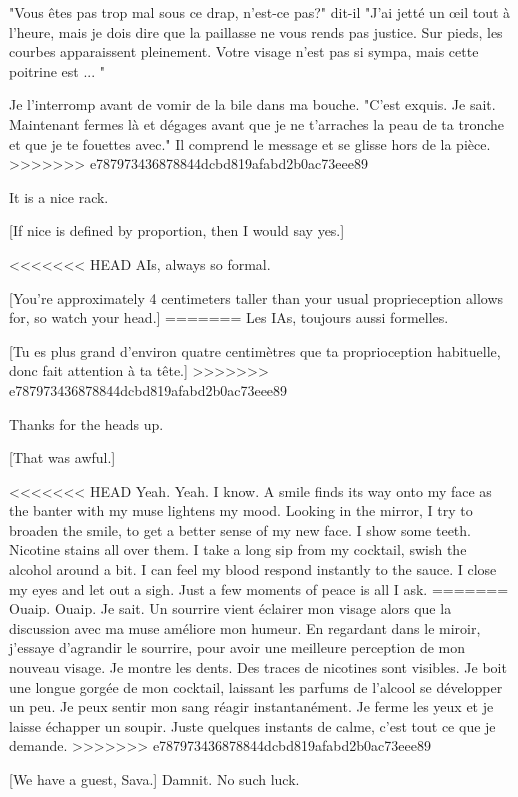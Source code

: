 "Vous êtes pas trop mal sous ce drap, n'est-ce pas?" dit-il "J'ai jetté un œil tout à l'heure, mais je dois dire que la paillasse ne vous rends pas justice. Sur pieds, les courbes apparaissent pleinement. Votre visage n'est pas si sympa, mais cette poitrine est ... " 

Je l'interromp avant de vomir de la bile dans ma bouche. "C'est exquis. Je sait. Maintenant fermes là et dégages avant que je ne t'arraches la peau de ta tronche et que je te fouettes avec." Il comprend le message et se glisse hors de la pièce. 
>>>>>>> e787973436878844dcbd819afabd2b0ac73eee89

It is a nice rack. 

[If nice is defined by proportion, then I would say yes.] 

<<<<<<< HEAD
AIs, always so formal. 

[You're approximately 4 centimeters taller than your usual proprieception allows for, so watch your head.] 
=======
Les IAs, toujours aussi formelles. 

[Tu es plus grand d'environ quatre centimètres que ta proprioception habituelle, donc fait attention à ta tête.] 
>>>>>>> e787973436878844dcbd819afabd2b0ac73eee89

Thanks for the heads up. 

[That was awful.] 

<<<<<<< HEAD
Yeah. Yeah. I know. A smile finds its way onto my face as the banter with my muse lightens my mood. Looking in the mirror, I try to broaden the smile, to get a better sense of my new face. I show some teeth. Nicotine stains all over them. I take a long sip from my cocktail, swish the alcohol around a bit. I can feel my blood respond instantly to the sauce. I close my eyes and let out a sigh. Just a few moments of peace is all I ask. 
=======
Ouaip. Ouaip. Je sait. Un sourrire vient éclairer mon visage alors que la discussion avec ma muse améliore mon humeur. En regardant dans le miroir, j'essaye d'agrandir le sourrire, pour avoir une meilleure perception de mon nouveau visage. Je montre les dents. Des traces de nicotines sont visibles. Je boit une longue gorgée de mon cocktail, laissant les parfums de l'alcool se développer un peu. Je peux sentir mon sang réagir instantanément. Je ferme les yeux et je laisse échapper un soupir. Juste quelques instants de calme, c'est tout ce que je demande. 
>>>>>>> e787973436878844dcbd819afabd2b0ac73eee89

[We have a guest, Sava.] Damnit. No such luck. 

